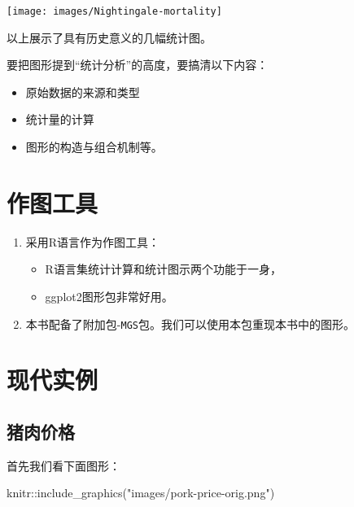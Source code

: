 \documentclass[
  lang=cn,
  11pt,
  scheme=chinese,
  chinesefont=nofont,
  citestyle=gb7714-2015,
  bibstyle=gb7714-2015]{elegantbook}
\newenvironment{Shaded}{\begin{snugshade}}{\end{snugshade}}
\newcommand{\FunctionTok}[1]{\textcolor[rgb]{0.00,0.00,0.00}{#1}}
\newcommand{\NormalTok}[1]{#1}
\newcommand{\SpecialCharTok}[1]{\textcolor[rgb]{0.00,0.00,0.00}{#1}}
\newcommand{\StringTok}[1]{\textcolor[rgb]{0.31,0.60,0.02}{#1}}
\providecommand{\tightlist}{%
  \setlength{\itemsep}{0pt}\setlength{\parskip}{0pt}}
\begin{document}
\begin{center}\texttt{[image: images/Nightingale-mortality]} \end{center}

以上展示了具有历史意义的几幅统计图。

要把图形提到``统计分析''的高度，要搞清以下内容：

\begin{itemize}
\tightlist
\item
  原始数据的来源和类型
\item
  统计量的计算
\item
  图形的构造与组合机制等。
\end{itemize}

\hypertarget{tools}{%
\chapter{作图工具}\label{tools}}

\begin{enumerate}
\def\labelenumi{\arabic{enumi}.}
\item
  采用R语言作为作图工具：

  \begin{itemize}
  \item
    R语言集统计计算和统计图示两个功能于一身，
  \item
    ggplot2图形包非常好用。
  \end{itemize}
\item
  本书配备了附加包-\texttt{MGS}包。我们可以使用本包重现本书中的图形。
\end{enumerate}

\hypertarget{examples}{%
\chapter{现代实例}\label{examples}}

\hypertarget{sec:three1}{%
\section{猪肉价格}\label{sec:three1}}

首先我们看下面图形：

\begin{Shaded}
\begin{Highlighting}[]
\NormalTok{knitr}\SpecialCharTok{::}\FunctionTok{include\_graphics}\NormalTok{(}\StringTok{"images/pork{-}price{-}orig.png"}\NormalTok{)}
\end{Highlighting}
\end{Shaded}
\end{document}
